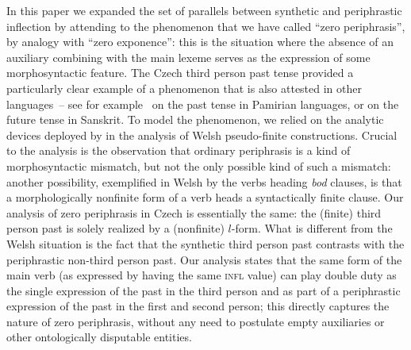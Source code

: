 \documentclass[output=paper]{langsci/langscibook}
\begin{document}
In this paper we expanded the set of parallels between synthetic and
periphras\-tic inflection by attending to the phenomenon that we have
called ``zero periphrasis'', by analogy with ``zero exponence'': this
is the situation where the absence of an auxiliary combining with the
main lexeme serves as the expression of some morphosyntactic
feature. The Czech third person past tense provided a particularly
clear example of a phenomenon that is also attested in other
languages~-- see for example \citet{Stump11} on the past tense in
Pamirian languages, or \citet{Stump13b} on the future tense in
Sanskrit. To model the phenomenon, we relied on the analytic devices
deployed by \citet{Bonami16b} in the analysis of Welsh pseudo-finite
constructions. Crucial to the analysis is the observation that
ordinary periphrasis is a kind of morphosyntactic mismatch, but not
the only possible kind of such a mismatch: another possibility,
exemplified in Welsh by the verbs heading \emph{bod} clauses, is that
a morphologically nonfinite form of a verb heads a syntactically
finite clause. Our analysis of zero periphrasis in Czech is
essentially the same: the (finite) third person past is solely
realized by a (nonfinite) $l$-form. What is different from the Welsh
situation is the fact that the synthetic third person past contrasts
with the periphrastic non-third person past. Our analysis states that
the same form of the main verb (as expressed by having the same
\textsc{infl} value) can play double duty as the single expression of
the past in the third person and as part of a periphras\-tic expression
of the past in the first and second person; this directly captures the
nature of zero periphrasis, without any need to postulate empty
auxiliaries or other ontologically disputable entities.
\end{document}
